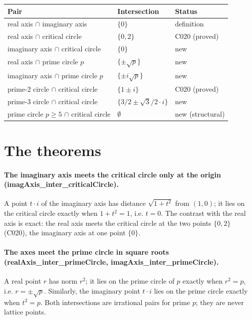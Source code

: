 \documentclass[sigplan,10pt,anonymous,review]{acmart}
\begin{document}
\begin{center}
\begin{tabular}{lll}
\toprule
Pair & Intersection & Status \\
\midrule
real axis $\cap$ imaginary axis & $\{0\}$ & definition \\
real axis $\cap$ critical circle & $\{0, 2\}$ & C020 (proved) \\
imaginary axis $\cap$ critical circle & $\{0\}$ & new \\
real axis $\cap$ prime circle $p$ & $\{\pm\sqrt{p}\}$ & new \\
imaginary axis $\cap$ prime circle $p$ & $\{\pm i\sqrt{p}\}$ & new \\
prime-2 circle $\cap$ critical circle & $\{1 \pm i\}$ & C020 (proved) \\
prime-3 circle $\cap$ critical circle & $\{3/2 \pm \sqrt{3}/2 \cdot i\}$ & new \\
prime circle $p \ge 5$ $\cap$ critical circle & $\emptyset$ & new (structural) \\
\bottomrule
\end{tabular}
\end{center}

\section{The theorems}

\paragraph{The imaginary axis meets the critical circle only at the
origin (imagAxis\_inter\_criticalCircle).} A point $t \cdot i$ of the
imaginary axis has distance $\sqrt{1 + t^2}$ from $(1,0)$; it lies on
the critical circle exactly when $1 + t^2 = 1$, i.e. $t = 0$. The
contrast with the real axis is exact: the real axis meets the critical
circle at the two points $\{0, 2\}$ (C020), the imaginary axis at one
point $\{0\}$.

\paragraph{The axes meet the prime circle in square roots
(realAxis\_inter\_primeCircle, imagAxis\_inter\_primeCircle).}
A real point $r$ has norm $r^2$; it lies on the prime circle of $p$
exactly when $r^2 = p$, i.e. $r = \pm\sqrt{p}$. Similarly, the
imaginary point $t \cdot i$ lies on the prime circle exactly when
$t^2 = p$. Both intersections are irrational pairs for prime $p$;
they are never lattice points.
\end{document}
